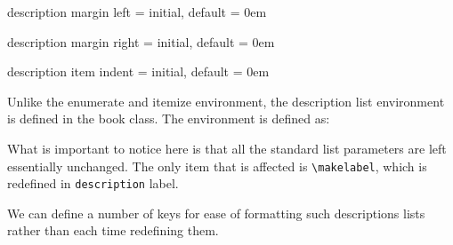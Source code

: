 \begin{docKey} {description margin left} { =  } {initial, default = 0em}
\end{docKey}

\begin{docKey} {description margin right} { =  } {initial, default = 0em}
\end{docKey}

\begin{docKey} {description item indent} { =  } {initial, default = 0em}
\end{docKey}

Unlike the enumerate and itemize environment, the description list environment is defined in the book class.
The environment is defined as:
\begin{teXXX}
\newenvironment{description}
  {\list{}{\labelwidth\z@ \itemindent-\leftmargin
    \let\makelabel\descriptionlabel}}
  {\endlist}
\newcommand*\descriptionlabel[1]{\hspace\labelsep\labelcolor@cx
  \normalfont\bfseries #1}
\end{teXXX}


What is important to notice here is that all the standard list parameters are left essentially unchanged. The only item that is affected is \lstinline{\makelabel}, which is redefined in \lstinline{description} label.


We can define a number of keys for ease of formatting such descriptions lists rather than each time redefining them.


%




